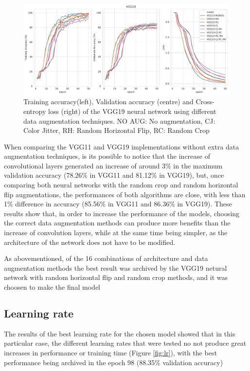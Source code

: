 \documentclass[10pt,twocolumn,letterpaper]{article}
\begin{document}
\begin{figure}[h]
	\begin{center}
		\includegraphics[width=1.0\linewidth]{vgg19_aug.pdf}
		\caption{Training accuracy(left), Validation accuracy (centre) and Cross-entropy loss (right) of the VGG19 neural network using different data augmentation techniques. NO AUG: No augmentation, CJ: Color Jitter, RH: Random Horizontal Flip, RC: Random Crop}
		\label{fig:vgg19-aug}
	\end{center}
\end{figure}

When comparing the VGG11 and VGG19 implementations without extra data augmentation techniques, is its possible to notice that the increase of convolutional layers generated an increase of around 3\% in the maximum validation accuracy (78.26\% in VGG11 and 81.12\% in VGG19), but, once comparing both neural networks with the random crop and random horizontal flip augmentations, the performances of both algorithms are close, with less than 1\% difference in accuracy (85.56\% in VGG11 and 86.36\% in VGG19). These results show that, in order to increase the performance of the models, choosing the correct data augmentation methods can produce more benefits than the increase of convolution layers, while at the same time being simpler, as the architecture of the network does not have to be modified.

As abovementioned, of the 16 combinations of architecture and data augmentation methods the best result was archived by the VGG19 netural network with random horizontal flip and random crop methods, and it was choosen to make the final model


\subsection{Learning rate}

The results of the best learning rate for the chosen model showed that in this particular case, the different learning rates that were tested no not produce great increases in performance or training time (Figure \ref{fig:lr}), with the best performance being archived in the epoch 98 (88.35\% validation accuracy)
\end{document}

